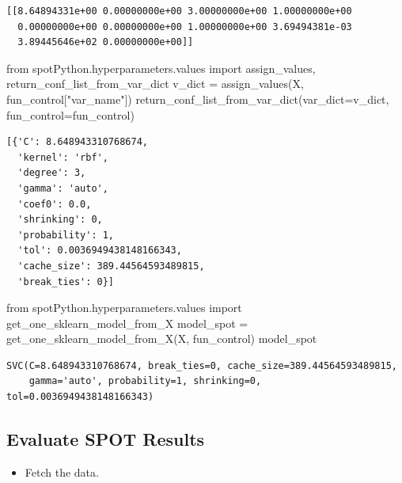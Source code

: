 \documentclass[
  letterpaper,
  DIV=11,
  numbers=noendperiod]{scrreprt}
\newenvironment{Shaded}{\begin{snugshade}}{\end{snugshade}}
\newcommand{\ImportTok}[1]{\textcolor[rgb]{0.00,0.46,0.62}{#1}}
\newcommand{\NormalTok}[1]{\textcolor[rgb]{0.00,0.23,0.31}{#1}}
\newcommand{\OperatorTok}[1]{\textcolor[rgb]{0.37,0.37,0.37}{#1}}
\newcommand{\StringTok}[1]{\textcolor[rgb]{0.13,0.47,0.30}{#1}}
\providecommand{\tightlist}{%
  \setlength{\itemsep}{0pt}\setlength{\parskip}{0pt}}\usepackage{longtable,booktabs,array}
\begin{document}
\begin{verbatim}
[[8.64894331e+00 0.00000000e+00 3.00000000e+00 1.00000000e+00
  0.00000000e+00 0.00000000e+00 1.00000000e+00 3.69494381e-03
  3.89445646e+02 0.00000000e+00]]
\end{verbatim}

\begin{Shaded}
\begin{Highlighting}[]
\ImportTok{from}\NormalTok{ spotPython.hyperparameters.values }\ImportTok{import}\NormalTok{ assign\_values, return\_conf\_list\_from\_var\_dict}
\NormalTok{v\_dict }\OperatorTok{=}\NormalTok{ assign\_values(X, fun\_control[}\StringTok{"var\_name"}\NormalTok{])}
\NormalTok{return\_conf\_list\_from\_var\_dict(var\_dict}\OperatorTok{=}\NormalTok{v\_dict, fun\_control}\OperatorTok{=}\NormalTok{fun\_control)}
\end{Highlighting}
\end{Shaded}

\begin{verbatim}
[{'C': 8.648943310768674,
  'kernel': 'rbf',
  'degree': 3,
  'gamma': 'auto',
  'coef0': 0.0,
  'shrinking': 0,
  'probability': 1,
  'tol': 0.0036949438148166343,
  'cache_size': 389.44564593489815,
  'break_ties': 0}]
\end{verbatim}

\begin{Shaded}
\begin{Highlighting}[]
\ImportTok{from}\NormalTok{ spotPython.hyperparameters.values }\ImportTok{import}\NormalTok{ get\_one\_sklearn\_model\_from\_X}
\NormalTok{model\_spot }\OperatorTok{=}\NormalTok{ get\_one\_sklearn\_model\_from\_X(X, fun\_control)}
\NormalTok{model\_spot}
\end{Highlighting}
\end{Shaded}

\begin{verbatim}
SVC(C=8.648943310768674, break_ties=0, cache_size=389.44564593489815,
    gamma='auto', probability=1, shrinking=0, tol=0.0036949438148166343)
\end{verbatim}

\hypertarget{evaluate-spot-results-2}{%
\subsection{Evaluate SPOT Results}\label{evaluate-spot-results-2}}

\begin{itemize}
\tightlist
\item
  Fetch the data.
\end{itemize}
\end{document}
